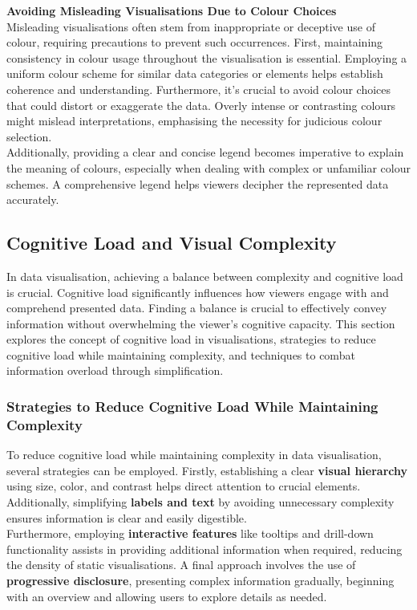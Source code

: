 \documentclass{article}\usepackage[]{graphicx}\usepackage[]{xcolor}
\numberwithin{equation}{section}
\begin{document}
\noindent \textbf{Avoiding Misleading Visualisations Due to Colour Choices}\\
Misleading visualisations often stem from inappropriate or deceptive use of colour, requiring precautions to prevent such occurrences. First, maintaining consistency in colour usage throughout the visualisation is essential. Employing a uniform colour scheme for similar data categories or elements helps establish coherence and understanding. Furthermore, it's crucial to avoid colour choices that could distort or exaggerate the data. Overly intense or contrasting colours might mislead interpretations, emphasising the necessity for judicious colour selection.\\

\noindent 
Additionally, providing a clear and concise legend becomes imperative to explain the meaning of colours, especially when dealing with complex or unfamiliar colour schemes. A comprehensive legend helps viewers decipher the represented data accurately.\\


\subsection{Cognitive Load and Visual Complexity}
In data visualisation, achieving a balance between complexity and cognitive load is crucial. Cognitive load significantly influences how viewers engage with and comprehend presented data. Finding a balance is crucial to effectively convey information without overwhelming the viewer's cognitive capacity. This section explores the concept of cognitive load in visualisations, strategies to reduce cognitive load while maintaining complexity, and techniques to combat information overload through simplification.

\subsubsection{Strategies to Reduce Cognitive Load While Maintaining Complexity}
To reduce cognitive load while maintaining complexity in data visualisation, several strategies can be employed. Firstly, establishing a clear \textbf{visual hierarchy} using size, color, and contrast helps direct attention to crucial elements. Additionally, simplifying \textbf{labels and text} by avoiding unnecessary complexity ensures information is clear and easily digestible.\\

\noindent Furthermore, employing \textbf{interactive features} like tooltips and drill-down functionality assists in providing additional information when required, reducing the density of static visualisations. A final approach involves the use of \textbf{progressive disclosure}, presenting complex information gradually, beginning with an overview and allowing users to explore details as needed.\\
\end{document}
